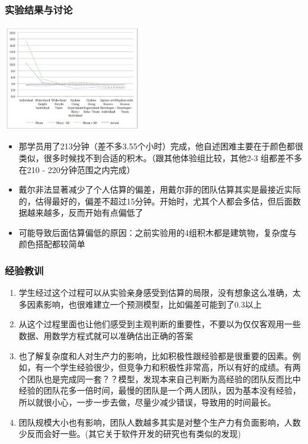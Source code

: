 \hypertarget{ux5b9eux9a8cux7ed3ux679cux4e0eux8ba8ux8bba}{%
\subsubsection{实验结果与讨论}\label{ux5b9eux9a8cux7ed3ux679cux4e0eux8ba8ux8bba}}


\includegraphics[width=6cm]{Lego3.jpg}\\

\begin{itemize}
\tightlist
\item
  那学员用了213分钟（差不多3.55个小时）完成，他自述困难主要在于颜色都很类似，很多时候找不到合适的积木。（跟其他体验组比较，其他2-3
  组都差不多在210 - 220分钟范围之内完成）
\item
  戴尔非法显著减少了个人估算的偏差，用戴尔菲的团队估算其实是最接近实际的，估得最好的，偏差不超过15分钟。开始时，尤其个人都会多估，但后面数据越来越多，反而开始有点偏低了
\item
  可能导致后面估算偏低的原因：之前实验用的4组积木都是建筑物，复杂度与颜色搭配都较简单
\end{itemize}

\hypertarget{ux7ecfux9a8cux6559ux8bad}{%
\subsubsection{经验教训}\label{ux7ecfux9a8cux6559ux8bad}}

\begin{enumerate}
\tightlist
\item
  学生经过这个过程可以从实验亲身感受到估算的局限，没有想象这么准确，太多因素影响，也很难建立一个预测模型，比如偏差可能到了0.3以上
\item
  从这个过程里面也让他们感受到主观判断的重要性，不要以为仅仅客观用一些数据、用数学方程式就可以准确估出正确的答案
\item
  也了解复杂度和人对生产力的影响，比如积极性跟经验都是很重要的因素。例如，有一个学生经验很少，但竞争力和积极性非常高，所以有好的成绩。有两个团队也是完成同一套？？模型，发现本来自己判断为高经验的团队反而比中经验的团队花多一倍时间，最慢的团队是一个两人团队，因为基本没有经验，所以就很小心，一步一步去做，尽量少减少错误，导致用的时间最长。
\item
  团队规模大小也有影响，团队人数越多其实是对整个生产力有负面影响，人数少反而会好一些。(其它关于软件开发的研究也有类似的发现)
\end{enumerate}

